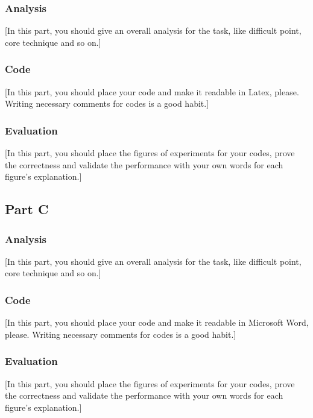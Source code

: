 \documentclass{article}
\begin{document}
\subsubsection{Analysis}

[In this part, you should give an overall analysis for the task, like difficult point, core technique and so on.]

\subsubsection{Code}

[In this part, you should place your code and make it readable in Latex, please. Writing necessary comments for codes is a good habit.]

\subsubsection{Evaluation}

[In this part, you should place the figures of experiments for your codes, prove the correctness and validate the performance with your own words for each figure’s explanation.]

\subsection{Part C}

\subsubsection{Analysis}

[In this part, you should give an overall analysis for the task, like difficult point, core technique and so on.]

\subsubsection{Code}

[In this part, you should place your code and make it readable in Microsoft Word, please. Writing necessary comments for codes is a good habit.]

\subsubsection{Evaluation}

[In this part, you should place the figures of experiments for your codes, prove the correctness and validate the performance with your own words for each figure’s explanation.]
\end{document}
